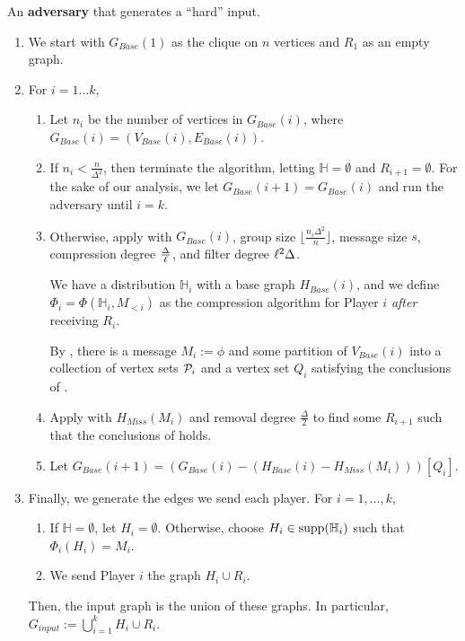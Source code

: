 \documentclass[11pt]{article}
\theoremstyle{definition}
\newcommand{\supp}[1]{\ensuremath{\textnormal{\text{supp}}(#1)}}
\begin{document}
\begin{mdframed}
An \textbf{adversary} that generates a ``hard'' input. 

\begin{enumerate}
    \item\label{1} We start with $G_{Base}(1)$ as the clique on $n$ vertices and $R_1$ as an empty graph.
    \item For $i=1\dots k$,
        \begin{enumerate}
            \item Let $n_i$ be the number of vertices in $G_{Base}(i)$, where $G_{Base}(i)=(V_{Base}(i), E_{Base}(i))$. 
            \item If $n_i<\frac n{\Delta^2}$, then terminate the algorithm, letting $\mathbb{H}=\emptyset$ and $R_{i+1}=\emptyset$. For the sake of our analysis, we let $G_{Base}(i+1)=G_{Base}(i)$ and run the adversary until $i=k$. 
            \item Otherwise, apply  with $G_{Base}(i)$, group size $\lfloor\frac {n_i\Delta^2}n\rfloor$, message size $s$, compression degree $\frac {\Delta}{\ell}$, and filter degree ${\ell}^2\Delta$. 
            
            We have a distribution $\mathbb{H}_i$ with a base graph $H_{Base}(i)$, and we define $\Phi_i=\Phi(\mathbb{H}_i, M_{<i})$ as the compression algorithm for Player $i$ \textit{after} receiving $R_i$. 
            
            By , there is a message $M_i:=\phi$ and some partition of $V_{Base}(i)$ into a collection of vertex sets $\mathcal{P}_i$ and a vertex set $Q_i$ satisfying the conclusions of .

            \item Apply  with $H_{Miss}(M_i)$ and removal degree $\frac{\Delta}2$ to find some $R_{i+1}$ such that the conclusions of  holds. 
            
            \item Let $G_{Base}(i+1)=(G_{Base}(i)-(H_{Base}(i)-H_{Miss}(M_i)))[Q_i]$. 
        \end{enumerate}
        \item Finally, we generate the edges we send each player. For $i=1,\dots,k$,
        \begin{enumerate}
            \item If $\mathbb{H}=\emptyset$, let $H_i=\emptyset$. Otherwise, choose $H_i\in \supp{\mathbb{H}_i}$ such that $\Phi_i(H_i)=M_i$.
            \item We send Player $i$ the graph $H_i\cup R_i$. 
        \end{enumerate}
        Then, the input graph is the union of these graphs. In particular, $G_{input}:=\bigcup_{i=1}^k H_i\cup R_i$. 
\end{enumerate}
\end{mdframed}
\end{document}

